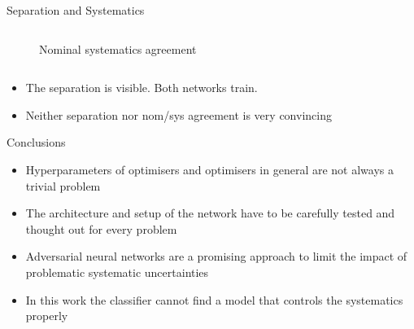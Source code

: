 \documentclass[12pt]{beamer}
\begin{document}
\begin{frame}{Separation and Systematics}
\begin{column}{0.5\textwidth}
\begin{figure}
        \caption{Nominal systematics agreement}
        \label{fig:my_label}
    \end{figure}
\end{column}
\begin{itemize}
    \item The separation is visible. Both networks train.
    \item Neither separation nor nom/sys agreement is very convincing
\end{itemize}
\end{frame}

\begin{frame}{Conclusions}
    \begin{itemize}
        \item Hyperparameters of optimisers and optimisers in general are not always a trivial problem
        \vspace{0.3cm}
        \item The architecture and setup of the network have to be carefully tested and thought out for every problem
        \vspace{0.3cm}
        \item Adversarial neural networks are a promising approach to limit the impact of problematic systematic uncertainties
        \vspace{0.3cm}
        \item In this work the classifier cannot find a model that controls the systematics properly
    \end{itemize}
\end{frame}


    
\end{document}
